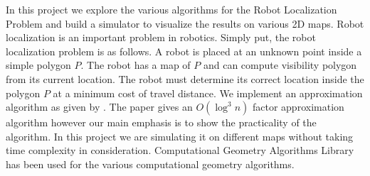 


\begin{abstracts}        %

In this project we explore the various algorithms for the Robot Localization Problem and build a simulator to visualize the results on
various 2D maps.
Robot localization is an important problem in robotics. Simply put, the robot localization problem is as follows. A robot is 
placed at an unknown point inside a simple polygon $ P $. The robot has a map of 
$ P$ and can compute visibility polygon from its current location. The robot must determine its correct 
location inside the polygon $P $ at a minimum cost of travel distance. We implement an approximation algorithm 
as given by \cite{key1}. The paper gives an ${O(\log^3 n)} $ factor approximation algorithm however our main emphasis is to show the practicality
of the algorithm. In this project we are simulating it on different maps without taking time complexity in consideration. Computational Geometry Algorithms Library \cite{CGAL} has been used for the various computational geometry
algorithms.



\end{abstracts}




